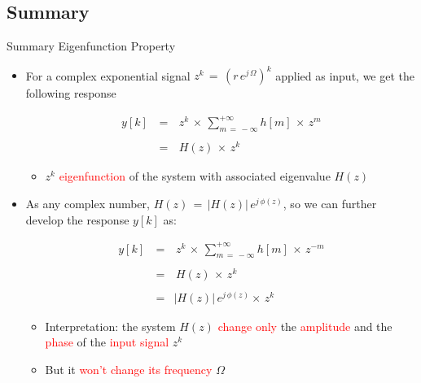 \subsection{Summary}
\begin{frame}[t,allowframebreaks]{Summary Eigenfunction Property}

\begin{itemize}

\item For a complex exponential signal $z^k \, = \, (r \, e^{j \, \Omega})^k$ applied as input, we get the following response

\begin{equation}
\begin{array}{rcl}
y[k] \, &=& \, z^k \, \times \, \displaystyle\sum_{m \, = \, - \infty}^{+ \infty} h[m] \, \times \, z^m \\ \\
&=& \, H(z) \, \times \, z^k  
\end{array}
\end{equation}

	\begin{itemize}
	\item $z^k$ \textcolor{red}{eigenfunction} of the system with associated eigenvalue $H(z)$ 
	\end{itemize}


\item As any complex number, $H(z) \, = \, |H(z)| \, e^{j \, \phi(z)}$, so we can further develop the response $y[k]$ as:

\begin{equation}
\begin{array}{rcl}
y[k] \, &=& \, z^k \, \times \, \displaystyle\sum_{m \, = \, - \infty}^{+ \infty} h[m] \, \times \, z^{-m} \\ \\
&=& \, H(z) \, \times \, z^k \\ \\
&=& |H(z)| \, e^{j \, \phi(z)}   \times \, z^k 
\end{array}
\end{equation}

	\begin{itemize}
	\item Interpretation: the system $H(z)$ \textcolor{red}{change only} the \textcolor{red}{amplitude} and the \textcolor{red}{phase} of the \textcolor{red}{input signal} $z^k$
	
	\item But it \textcolor{red}{won't change its frequency} $\Omega$
	\end{itemize}

\end{itemize}


\end{frame}


